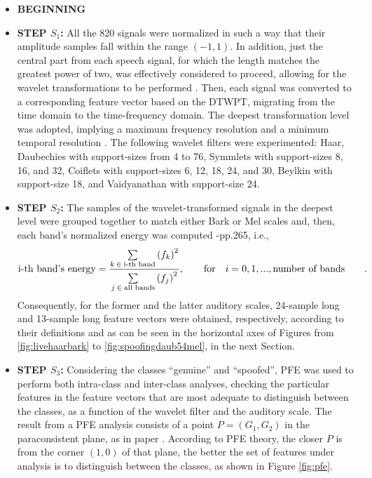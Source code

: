 \begin{itemize}
\item{}\textbf{BEGINNING}
\item{}\textbf{STEP $S_1$: }All the 820 signals were normalized in such a way that their amplitude samples fall within the range $(-1,1)$. In addition, just the central part from each speech signal, for which the length matches the greatest power of two, was effectively considered to proceed, allowing for the wavelet transformations to be performed \cite{guidodwt1}. Then, each signal was converted to a corresponding feature vector based on the DTWPT, migrating from the time domain to the time-frequency domain. The deepest transformation level was adopted, implying a maximum frequency resolution and a minimum temporal resolution \cite{guidodwt1}. The following wavelet filters were experimented: Haar, Daubechies with support-sizes from 4 to 76, Symmlets with support-sizes 8, 16, and 32, Coiflets with support-sizes 6, 12, 18, 24, and 30, Beylkin with support-size 18, and Vaidyanathan with support-size 24. 
\item{}\textbf{STEP $S_2$: }The samples of the wavelet-transformed signals in the deepest level were grouped together to match either Bark \cite{bossi} or Mel scales \cite{bossi2} and, then, each band's normalized energy was computed \cite{tut_se}-pp.265, i.e., $$\text{i-th band's energy}=\frac{\sum\limits_{k \hspace*{+2pt} \in \hspace*{+2pt} \text{i-th band}}{{(f_k)}^{2}}}{\sum\limits_{j \hspace*{+2pt} \in \hspace*{+2pt} \text{all bands}}^{}{(f_j)}^{2}}, \qquad \text{for} \quad i=0, 1, ..., \text{number of bands}\qquad .$$ Consequently, for the former and the latter auditory scales, 24-sample long and 13-sample long feature vectors were obtained, respectively, according to their definitions \cite{bossi2} and as can be seen in the horizontal axes of Figures from \ref{fig:livehaarbark} to \ref{fig:spoofingdaub54mel}, in the next Section.  
\item{}\textbf{STEP $S_3$: }Considering the classes ``genuine'' and ``spoofed'', PFE was used to perform both intra-class and inter-class analyses, checking the particular features in the feature vectors that are most adequate to distinguish between the classes, as a function of the wavelet filter and the auditory scale. The result from a PFE analysis consists of a point $P=(G_1,G_2)$ in the paraconsistent plane, as in paper \cite{8588433}. According to PFE theory, the closer $P$ is from the corner $(1,0)$ of that plane, the better the set of features under analysis is to distinguish between the classes, as shown in Figure \ref{fig:pfe}. 

\end{itemize}
